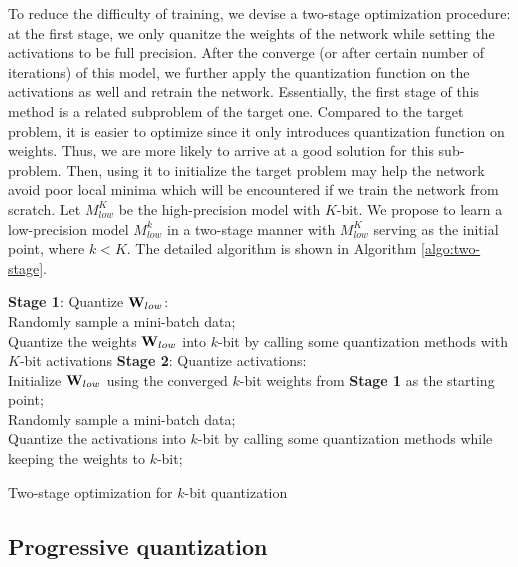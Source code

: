 \documentclass[10pt,twocolumn,letterpaper]{article}
\begin{document}
To reduce the difficulty of training, we devise a two-stage optimization procedure: at the first stage, we only quanitze the weights of the network while setting the activations to be full precision. After the converge (or after certain number of iterations) of this model, we further apply the quantization function on the activations as well and retrain the network. Essentially, the first stage of this method is a related subproblem of the target one. Compared to the target problem, it is easier to optimize since it only introduces quantization function on weights. Thus, we are more likely to arrive at a good solution for this sub-problem. Then, using it to initialize the target problem may help the network avoid poor local minima which will be encountered if we train the network from scratch.
Let $M_{low}^{K}$ be the high-precision model with $K$-bit. We propose to learn a low-precision model $M_{low}^{k}$ in a two-stage manner with $M_{low}^{K}$ serving as the initial point, where $k<K$.
 The detailed algorithm is shown in Algorithm \ref{algo:two-stage}.
\begin{algorithm}[]

	\textbf{Stage 1}: Quantize ${{\bf{W}}_{low}}$:\\
	{
		{
			Randomly sample a mini-batch data;\\
			Quantize the weights ${{\bf{W}}_{low}}$ into $k$-bit by calling some quantization methods with $K$-bit activations\;
		}
	}
	\textbf{Stage 2}: Quantize activations:\\
	Initialize ${{\bf{W}}_{low}}$ using the converged $k$-bit weights from \textbf{Stage 1} as the starting point; \\
	{
		{
			Randomly sample a mini-batch data;\\
			Quantize the activations into $k$-bit  by calling some quantization methods while keeping the weights to $k$-bit;
		}
	}
	\caption{Two-stage optimization for $k$-bit quantization}
	\label{algo:two-stage}
\end{algorithm}


\subsection{Progressive quantization} \label{sec:progressive}
\end{document}
